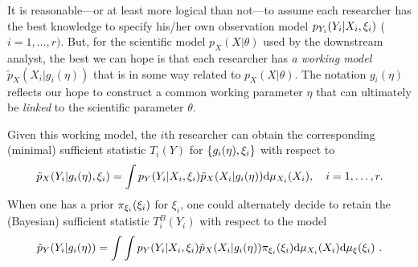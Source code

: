 It is reasonable---or at least more logical than not---to assume each researcher has the best knowledge to specify  his/her own observation model $p_{Y_i}(Y_i | X_i, \xi_i)$ ($i=1,\ldots, r)$.
But, for the scientific model $p_X(X|\theta)$ used by the downstream analyst, the best we can hope is that each researcher has \textit{a working model} $\tilde p_X(X_{i}|g_i(\eta))$ that is in some way related to $p_X(X|\theta)$.
The notation $g_i(\eta)$ reflects our hope to construct a common working parameter $\eta$ that can ultimately be \textit{linked} to the scientific parameter $\theta$.
 
Given this working model, the $i$th researcher can obtain the corresponding (minimal) sufficient statistic $T_i(Y)$ for $\{ g_i(\eta), \xi_i\}$ with respect to 
\begin{equation}\label{multiphase:e:prob}
  \pwork(Y_i | g_i(\workparam), \obsparam_i) = \int \pobs(Y_i | X_i, \obsparam_i) \pwork(X_i | g_i(\workparam)) \dd \mu_{X_i}(X_i), \quad i=1,\ldots, r.
\end{equation}
When one has a prior $ \pi_{\xi_i}(\xi_i)$ for  $\xi_i$, one could alternately decide to retain the (Bayesian) sufficient statistic $T_i^{B}(Y_{i})$ with respect to the model 
\begin{equation}\label{multiphase:e:prom}
  \pywork(Y_i | g_i(\workparam)) = \int \int \pobs(Y_i | X_i, \obsparam_i) \pwork(X_i | g_i(\workparam)) \pi_{\obsparam_i}(\obsparam_i) \dd \mu_{X_i}(X_i) \dd \mu_\obsparam(\obsparam_i)\ .
\end{equation} 

